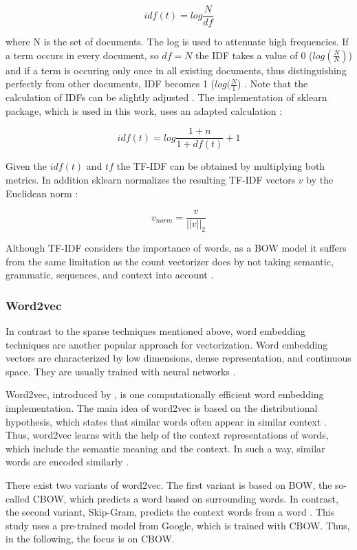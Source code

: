 \documentclass[12pt, a4paper, titlepage]{article}
\begin{document}
\[idf(t) = log \frac{N}{df} \]

where N is the set of documents. The log is used to attenuate high frequencies. If a term occurs in every document, so $df = N$ the \ac{IDF} takes a value of 0 ($log (\frac{N}{N})$) and if a term is occuring only once in all existing documents, thus distinguishing perfectly from other documents, \ac{IDF} becomes 1 ($log (\frac{N}{1}$) \citep{sidorov2019}. Note that the calculation of \ac{IDF}s can be slightly adjusted \citep{robertson2004}. The implementation of sklearn package, which is used in this work, uses an adapted calculation \citep{scikit-learn}:

\[idf(t) = log \frac{1+n}{1+df(t)} + 1 \] 

Given the $idf(t)$ and $tf$ the \ac{TF-IDF} can be obtained by multiplying both metrics. In addition sklearn normalizes the resulting \ac{TF-IDF} vectors $v$ by the Euclidean norm \citep{scikit-learn}: 

\[v_{norm} = \frac{v}{||v||_2} \]

Although \ac{TF-IDF} considers the importance of words, as a \ac{BOW} model it suffers from the same limitation as the count vectorizer does by not taking semantic, grammatic, sequences, and context into account \citep{sarkar2016}. 

\subsubsection*{Word2vec}
In contrast to the sparse techniques mentioned above, word embedding techniques are another popular approach for vectorization. Word embedding vectors are characterized by low dimensions, dense representation, and continuous space. They are usually trained with neural networks \citep{li2015, jin2016}. 
  
Word2vec, introduced by \citet{mikolov2013}, is one computationally efficient word embedding implementation. The main idea of word2vec is based on the distributional hypothesis, which states that similar words often appear in similar context \citep{sahlgren2008}. Thus, word2vec learns with the help of the context representations of words, which include the semantic meaning and the context. In such a way, similar words are encoded similarly \citep{sarkar2016}. 

There exist two variants of word2vec. The first variant is based on \ac{BOW}, the so-called \ac{CBOW}, which predicts a word based on surrounding words. In contrast, the second variant, Skip-Gram, predicts the context words from a word \citep{ajose2020, sarkar2016}. This study uses a pre-trained model from Google, which is trained with \ac{CBOW}. Thus, in the following, the focus is on \ac{CBOW}. 
\end{document}
